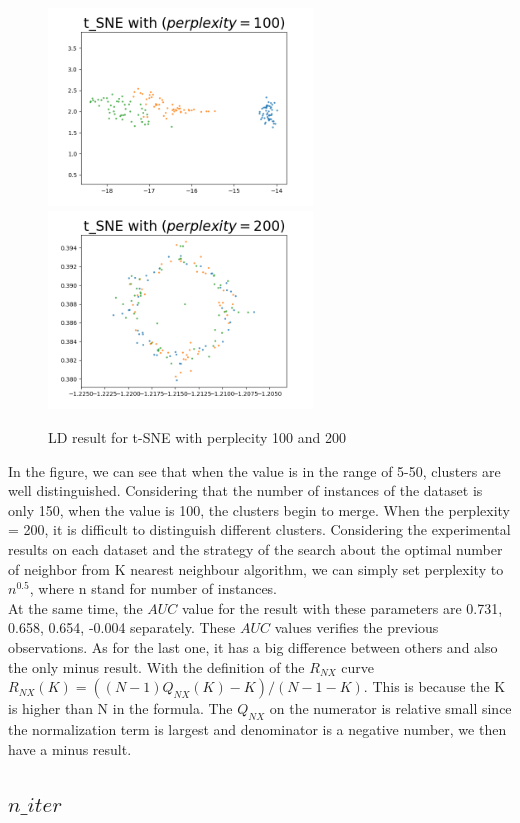 \begin{figure}[H]
\centering  %
{
\label{Fig.sub.1}
\includegraphics[width=7cm,height=3.5cm\textwidth]{images/image_comparison_tsne_perp100.png}}
{
\label{Fig.sub.2}
\includegraphics[width=7cm,height=3.5cm\textwidth]{images/image_comparison_tsne_perp200.png}}
\caption{LD result for t-SNE with  perplecity 100 and 200}
\end{figure}


\noindent In the figure, we can see that when the value is in the range of 5-50, clusters are well distinguished. Considering that the number of instances of the dataset is only 150, when the value is 100, the clusters begin to merge. When the perplexity = 200, it is difficult to distinguish different clusters. Considering the experimental results on each dataset and the strategy of the search about the optimal number of neighbor from K nearest neighbour algorithm\cite{ref12}, we can simply set perplexity to $n^{0.5}$, where n stand for number of instances. \\

\noindent At the same time, the $AUC$ value for the result with these parameters are 0.731, 0.658, 0.654, -0.004 separately. These $AUC$ values verifies the previous observations. As for the last one, it has a big difference between others and also the only minus result. With the definition of the $R_{NX}$ curve $R_{NX} (K) = ((N − 1)Q_{NX} (K) − K) /(N − 1 − K)$. This is because the K is higher than N in the formula. The $Q_{NX}$ on the numerator is relative small since the normalization term is largest and denominator is a negative number, we then have a minus result.

\subsection{$n\_iter$}

